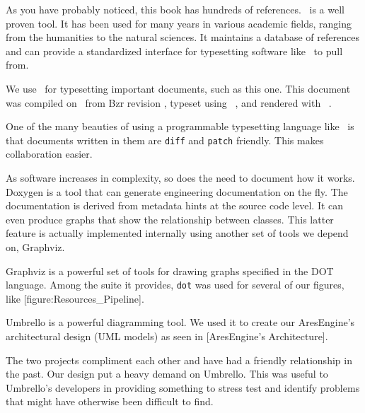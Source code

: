 

\startitemize[4]
\head {\em \BIBTEX}

As you have probably noticed, this book has hundreds of references. \BIBTEX\ is a well proven tool. It has been used for many years in various academic fields, ranging from the humanities to the natural sciences. It maintains a database of references and can provide a standardized interface for typesetting software like \CONTEXT\ to pull from.

\head {\em \CONTEXT}

We use \CONTEXT\ for typesetting important documents, such as this one. This document was compiled on \currentdate\ from Bzr revision \BzrRevisionClickable, typeset using \CONTEXT\ \contextversion, and rendered with \texenginename\ \texengineversion. 

One of the many beauties of using a programmable typesetting language like \CONTEXT\ is that documents written in them are {\tt diff} and {\tt patch} friendly. This makes collaboration easier.


As software increases in complexity, so does the need to document how it works. Doxygen is a tool that can generate engineering documentation on the fly. The documentation is derived from metadata hints at the source code level. It can even produce graphs that show the relationship between classes. This latter feature is actually implemented internally using another set of tools we depend on, Graphviz.


Graphviz is a powerful set of tools for drawing graphs specified in the DOT language. Among the suite it provides, {\tt dot} was used for several of our figures, like [figure:Resources_Pipeline].


Umbrello is a powerful diagramming tool. We used it to create our AresEngine's architectural design (UML models) as seen in [AresEngine's Architecture]. 

The two projects compliment each other and have had a friendly relationship in the past. Our design put a heavy demand on Umbrello. This was useful to Umbrello's developers in providing something to stress test and identify problems that might have otherwise been difficult to find.
\stopitemize

